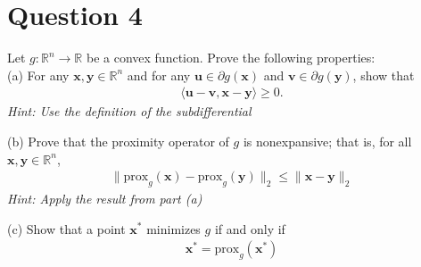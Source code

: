 \documentclass{article}
\newcommand{\R}{\mathbb{R}}
\begin{document}
\section*{Question 4}
Let \(g: \R^n \to \R\) be a convex function. Prove the following properties: \\
(a) For any \(\bm{x}, \bm{y} \in \R^n\) and for any \(\bm{u} \in \partial g(\bm{x})\) and \(\bm{v} \in \partial g(\bm{y})\), show that
\begin{align*}
    \langle \bm{u} - \bm{v}, \bm{x} - \bm{y}\rangle \geq 0.
\end{align*}
\textit{Hint: Use the definition of the subdifferential}

\noindent
(b) Prove that the proximity operator of \(g\) is nonexpansive; that is, for all \(\bm{x}, \bm{y} \in \R^n\),
\begin{align*}
    \|\text{prox}_g (\bm{x}) - \text{prox}_g(\bm{y})\|_2 \leq \|\bm{x} - \bm{y}\|_2
\end{align*}
\textit{Hint: Apply the result from part (a)}

\noindent
(c) Show that a point \(\bm{x}^*\) minimizes \(g\) if and only if
\begin{align*}
    \bm{x}^* = \text{prox}_g(\bm{x}^*)
\end{align*}
\end{document}
